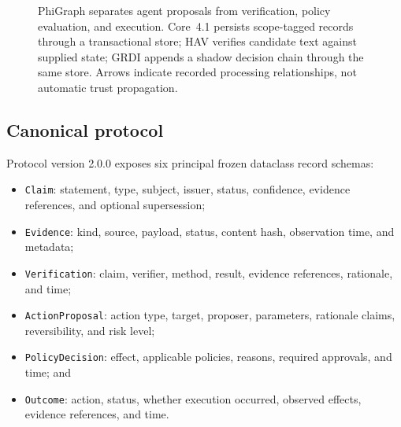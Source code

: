 \documentclass[11pt]{article}
\begin{document}
\begin{figure}[H]
{%
}
\caption{PhiGraph separates agent proposals from verification, policy
evaluation, and execution. Core~4.1 persists scope-tagged records through a
transactional store; HAV verifies candidate text against supplied state; GRDI
appends a shadow decision chain through the same store. Arrows indicate
recorded processing relationships, not automatic trust propagation.}
\label{fig:architecture}
\end{figure}

\subsection{Canonical protocol}

Protocol version 2.0.0 exposes six principal frozen dataclass record schemas:

\begin{itemize}[leftmargin=*]
  \item \texttt{Claim}: statement, type, subject, issuer, status, confidence,
        evidence references, and optional supersession;
  \item \texttt{Evidence}: kind, source, payload, status, content hash,
        observation time, and metadata;
  \item \texttt{Verification}: claim, verifier, method, result, evidence
        references, rationale, and time;
  \item \texttt{ActionProposal}: action type, target, proposer, parameters,
        rationale claims, reversibility, and risk level;
  \item \texttt{PolicyDecision}: effect, applicable policies, reasons,
        required approvals, and time; and
  \item \texttt{Outcome}: action, status, whether execution occurred, observed
        effects, evidence references, and time.
\end{itemize}
\end{document}
